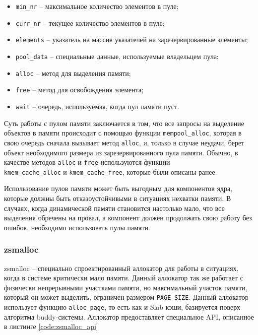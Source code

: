 \begin{itemize}
	\item \texttt{min\_nr} -- максимальное количество элементов в пуле;
	\item \texttt{curr\_nr} -- текущее количество элементов в пуле;
	\item \texttt{elements} -- указатель на массив указателей на зарезервированные элементы;
	\item \texttt{pool\_data} -- специальные данные, используемые владельцем пула;
	\item \texttt{alloc} -- метод для выделения памяти;
	\item \texttt{free} -- метод для освобождения элемента;
	\item \texttt{wait} -- очередь, используемая, когда пул памяти пуст.
\end{itemize}

\pagebreak


Суть работы с пулом памяти заключается в том, что все запросы на выделение объектов в памяти происходит с помощью функции \texttt{mempool\_alloc}, которая в свою очередь сначала вызывает метод \texttt{alloc}, и, только в случае неудачи, берет объект необходимого размера из зарезервированного пула памяти. Обычно, в качестве методов \texttt{alloc} и \texttt{free} используются функции \\ \texttt{kmem\_cache\_alloc} и \texttt{kmem\_cache\_free}, которые были описаны ранее.

Использование пулов памяти может быть выгодным для компонентов ядра, которые должны быть отказоустойчивыми в ситуациях нехватки памяти. В случаях, когда динамической памяти становится настолько мало, что все выделения обречены на провал, а компонент должен продолжать свою работу без ошибок, необходимо использовать пулы памяти.

\subsubsection{zsmalloc}

zsmalloc -- специально спроектированный аллокатор для работы в ситуациях, когда в системе критически мало памяти. Данный аллокатор так же работает с физически непрерывными участками памяти, но максимальный участок памяти, который он может выделить, ограничен размером \texttt{PAGE\_SIZE}. Данный аллокатор использует функцию \texttt{alloc\_page}, то есть как и Slab кэши, базируется поверх алгоритма buddy-системы. Аллокатор предоставляет специальное API, описанное в листинге \ref{code:zsmalloc_api}

